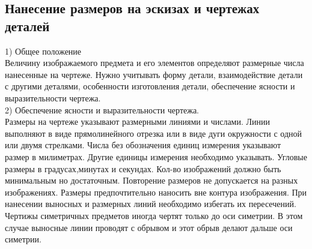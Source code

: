 \documentclass[a4paper, 12pt]{article}
\begin{document}
\subsection{Нанесение размеров на эскизах и чертежах деталей}
1) Общее положение\\
Величину изображаемого предмета и его элементов определяют размерные числа нанесенные на чертеже. Нужно учитывать форму детали, взаимодействие детали с другими деталями, особенности изготовления детали, обеспечение ясности и выразительности чертежа.\\

2) Обеспечение ясности и выразительности чертежа.\\
Размеры на чертеже указывают размерными линиями и числами. Линии выполняют в виде прямолинейного отрезка или в виде дуги окружности с одной или двумя стрелками. Числа без обозначения единиц измерения указывают размер в милиметрах. Другие единицы измерения необходимо указывать. Угловые размеры в градусах,минутах и секундах. Кол-во изображений должно быть минимальным но достаточным. Повторение размеров не допускается на разных изображениях. Размеры предпочтительно наносить вне контура изображения. При нанесении выносных и размерных линий необходимо избегать их пересечений. Чертижы симетричных предметов иногда чертят только до оси симетрии. В этом случае выносные линии проводят с обрывом и этот обрыв делают дальше оси симетрии.
\end{document}
